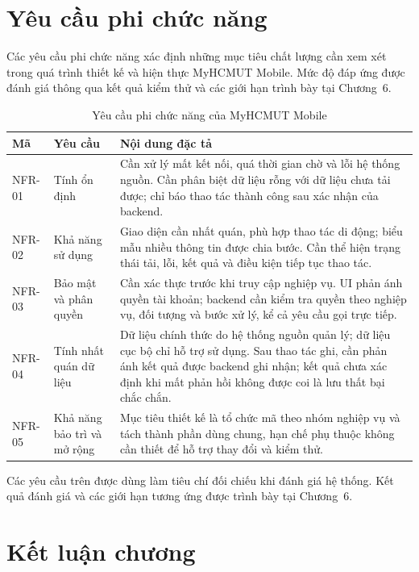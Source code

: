 \section{Yêu cầu phi chức năng}
\label{sec:yeucau_phichucnang}

Các yêu cầu phi chức năng xác định những mục tiêu chất lượng cần xem xét trong quá trình thiết kế và hiện thực MyHCMUT Mobile. Mức độ đáp ứng được đánh giá thông qua kết quả kiểm thử và các giới hạn trình bày tại Chương~6.

\begin{table}[H]
\centering\small
\caption{Yêu cầu phi chức năng của MyHCMUT Mobile}
\label{tab:nfr}
\begin{tabularx}{\textwidth}{|L{1.8cm}|L{3.4cm}|Y|}
\hline
\textbf{Mã} & \textbf{Yêu cầu} & \textbf{Nội dung đặc tả} \\
\hline
NFR-01 & Tính ổn định & Cần xử lý mất kết nối, quá thời gian chờ và lỗi hệ thống nguồn. Cần phân biệt dữ liệu rỗng với dữ liệu chưa tải được; chỉ báo thao tác thành công sau xác nhận của backend. \\
\hline
NFR-02 & Khả năng sử dụng & Giao diện cần nhất quán, phù hợp thao tác di động; biểu mẫu nhiều thông tin được chia bước. Cần thể hiện trạng thái tải, lỗi, kết quả và điều kiện tiếp tục thao tác. \\
\hline
NFR-03 & Bảo mật và phân quyền & Cần xác thực trước khi truy cập nghiệp vụ. UI phản ánh quyền tài khoản; backend cần kiểm tra quyền theo nghiệp vụ, đối tượng và bước xử lý, kể cả yêu cầu gọi trực tiếp. \\
\hline
NFR-04 & Tính nhất quán dữ liệu & Dữ liệu chính thức do hệ thống nguồn quản lý; dữ liệu cục bộ chỉ hỗ trợ sử dụng. Sau thao tác ghi, cần phản ánh kết quả được backend ghi nhận; kết quả chưa xác định khi mất phản hồi không được coi là lưu thất bại chắc chắn. \\
\hline
NFR-05 & Khả năng bảo trì và mở rộng & Mục tiêu thiết kế là tổ chức mã theo nhóm nghiệp vụ và tách thành phần dùng chung, hạn chế phụ thuộc không cần thiết để hỗ trợ thay đổi và kiểm thử. \\
\hline
\end{tabularx}
\end{table}

Các yêu cầu trên được dùng làm tiêu chí đối chiếu khi đánh giá hệ thống. Kết quả đánh giá và các giới hạn tương ứng được trình bày tại Chương~6.

\section{Kết luận chương}
\label{sec:ketluan_chuong4}

